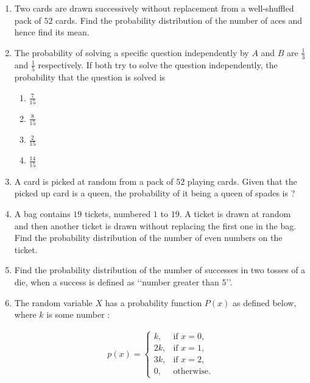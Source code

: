 \begin{enumerate}[label=\thesection.\arabic*.,ref=\thesection.\theenumi]
\item Two cards are drawn successively without replacement from a 
well-shuffled pack of $52$ cards. Find the probability 
distribution of the number of aces and hence find its mean.
\newpage

\item The probability of solving a specific question independently by $A$ and $B$ 
are $\frac{1}{3}$ and $\frac{1}{5}$ respectively. If both try to solve the question independently, 
the probability that the question is solved is 

\begin{enumerate}[label=(\alph*)]
    
 \item  $\frac{7}{15}$
 
 \item  $\frac{8}{15}$
 
 \item  $\frac{2}{15}$
 
 \item  $\frac{14}{15}$

\end{enumerate}

\item A card is picked at random from a pack of $52$ playing cards. Given that 
the picked up card is a queen, the probability of it being a queen of 
spades is ?

\item A bag contains $19$ tickets, numbered $1$ to $19$. A ticket is drawn at random 
and then another ticket is drawn without replacing the first one in the 
bag. Find the probability distribution of the number of even numbers on 
the ticket.

\item Find the probability distribution of the number of successes in two tosses 
of a die, when a success is defined as ‘‘number greater than $5$’’.

\item The random variable $X$ has a probability function $P(x)$ as defined below, 
where $k$ is some number :

\begin{align}
    p(x) = \begin{cases}
        k, & \text{if } x = 0, \\
        2k, & \text{if } x = 1, \\
        3k, & \text{if } x = 2, \\
        0, & \text{otherwise.}
    \end{cases}
\end{align}


\end{enumerate}
